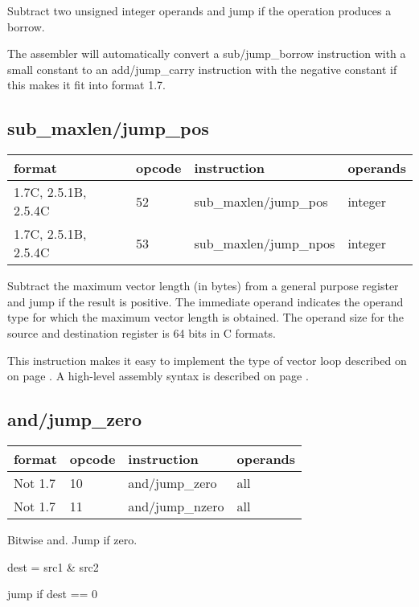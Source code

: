 \documentclass[forwardcom.tex]{subfiles}
\begin{document}
Subtract two unsigned integer operands and jump if the operation produces a borrow.
\vv

The assembler will automatically convert a sub/jump\_borrow instruction with a small constant to an add/jump\_carry instruction with the negative constant if this makes it fit into format 1.7.
\vv

\subsection{sub\_maxlen/jump\_pos}
\label{table:subMaxlenJumpPosInstruction}
\begin{tabular}{|p{24mm}|p{12mm}|p{52mm}|p{50mm}|}
\hline
\bfseries format & \bfseries opcode & \bfseries instruction & \bfseries operands \\ \hline
1.7C, 2.5.1B, 2.5.4C & 52 & sub\_maxlen/jump\_pos & integer \\ \hline
1.7C, 2.5.1B, 2.5.4C & 53 & sub\_maxlen/jump\_npos & integer \\ \hline
\end{tabular}
\vv

Subtract the maximum vector length (in bytes) from a general purpose register and jump if the result is positive.
The immediate operand indicates the operand type for which the maximum vector length is obtained. The operand size for the source and destination register is 64 bits in C formats.
\vv

This instruction makes it easy to implement the type of vector loop described on on page \pageref{vectorLoops}. A high-level assembly syntax is described on page \pageref{vectorLoopSyntax}.
\vv


\subsection{and/jump\_zero}
\label{table:andJumpZeroInstruction}
\begin{tabular}{|p{16mm}|p{12mm}|p{60mm}|p{50mm}|}
\hline
\bfseries format & \bfseries opcode & \bfseries instruction & \bfseries operands \\ \hline
Not 1.7 & 10 & and/jump\_zero & all \\ \hline
Not 1.7 & 11 & and/jump\_nzero & all \\ \hline
\end{tabular}
\vv

Bitwise and. Jump if zero.
\vv

dest = src1 \& src2

jump if dest == 0
\vv
\end{document}
